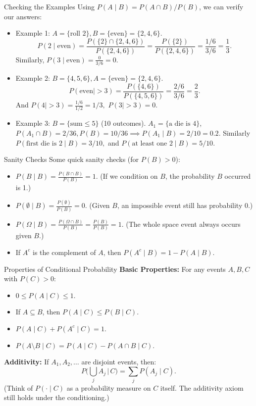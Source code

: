 \documentclass[aspectratio=169,11pt]{beamer} %
\begin{document}
\begin{frame}{Checking the Examples}
Using $P(A \mid B) = P(A \cap B)/P(B)$, we can verify our answers:
\begin{itemize}
  \item Example 1: $A=\{\text{roll 2}\}, B=\{\text{even}\} = \{2,4,6\}.$ 
  \[P(2 \mid \text{even}) = \frac{P(\{2\} \cap \{2,4,6\})}{P(\{2,4,6\})} = \frac{P(\{2\})}{P(\{2,4,6\})} = \frac{1/6}{3/6} = \frac{1}{3}.\] 
  Similarly, $P(3 \mid \text{even}) = \frac{0}{3/6} = 0.$
  \item Example 2: $B=\{4,5,6\}, A=\{\text{even}\}=\{2,4,6\}.$ 
  \[P(\text{even} \mid >3) = \frac{P(\{4,6\})}{P(\{4,5,6\})} = \frac{2/6}{3/6} = \frac{2}{3}.\] 
  And $P(4 \mid >3) = \frac{1/6}{1/2} = 1/3,$ $P(3 \mid >3)=0.$
  \item Example 3: $B=\{\text{sum}\le5\}$ (10 outcomes). $A_1=\{\text{a die is 4}\}$, $P(A_1 \cap B) = 2/36, P(B)=10/36 \implies P(A_1 \mid B) = 2/10 = 0.2.$ 
  Similarly $P(\text{first die is 2} \mid B) = 3/10,$ and $P(\text{at least one 2} \mid B) = 5/10.$
\end{itemize}
\end{frame}

\begin{frame}{Sanity Checks}
Some quick sanity checks (for $P(B)>0$):
\begin{itemize}
    \item $P(B \mid B) = \frac{P(B \cap B)}{P(B)} = 1.$ (If we condition on $B$, the probability $B$ occurred is 1.)
    \item $P(\emptyset \mid B) = \frac{P(\emptyset)}{P(B)} = 0.$ (Given $B$, an impossible event still has probability 0.)
    \item $P(\Omega \mid B) = \frac{P(\Omega \cap B)}{P(B)} = \frac{P(B)}{P(B)} = 1.$ (The whole space event always occurs given $B$.)
    \item If $A^c$ is the complement of $A$, then $P(A^c \mid B) = 1 - P(A \mid B)$.
\end{itemize}
\end{frame}

\begin{frame}[fragile]{Properties of Conditional Probability}
\textbf{Basic Properties:} For any events $A, B, C$ with $P(C)>0$:
\begin{itemize}
    \item $0 \le P(A \mid C) \le 1.$
    \item If $A \subseteq B$, then $P(A \mid C) \le P(B \mid C).$
    \item $P(A \mid C) + P(A^c \mid C) = 1.$
    \item $P(A \setminus B \mid C) = P(A \mid C) - P(A \cap B \mid C).$
\end{itemize}

\textbf{Additivity:} If $A_1, A_2, \dots$ are disjoint events, then:
\[ P\Big(\bigcup_{j} A_j \,\Big|\, C\Big) = \sum_{j} P(A_j \mid C).\] 
(Think of $P(\cdot \mid C)$ as a probability measure on $C$ itself. The additivity axiom still holds under the conditioning.)
\end{frame}
\end{document}
